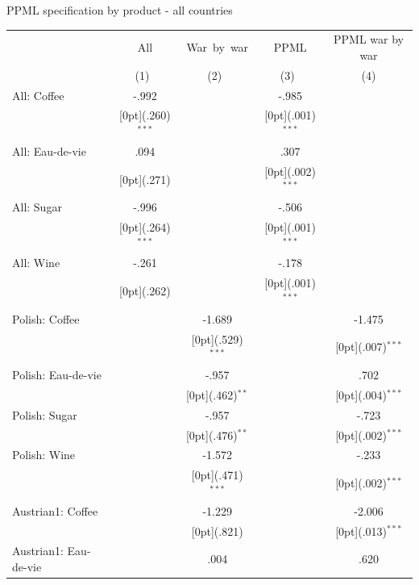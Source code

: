 \documentclass[12pt,a4paper,titlepage]{article}
\begin{document}
{\newpage
\caption{PPML specification by product - all countries}
\begin{tabular*}{\textwidth}{@{\extracolsep{\fill}}lcccc}				
	& \multicolumn{1}{c}{All} &	\multicolumn{1}{c}{War~by~war} &	\multicolumn{1}{c}{PPML} &	\multicolumn{1}{c}{PPML war by war} \\
\cline{2-5}				
	& \multicolumn{1}{c}{(1)\mbox{\ }} &	\multicolumn{1}{c}{(2)\mbox{\ }} &	\multicolumn{1}{c}{(3)\mbox{\ }} &	\multicolumn{1}{c}{(4)} \\
\hline				
All: Coffee &	-.992 &	&	-.985 &	\\
&	\raisebox{.7ex}[0pt]{\scriptsize (.260)$^{***}$} &	&	\raisebox{.7ex}[0pt]{\scriptsize (.001)$^{***}$} &	\\
All: Eau-de-vie &	.094 &	&	.307 &	\\
&	\raisebox{.7ex}[0pt]{\scriptsize (.271)} &	&	\raisebox{.7ex}[0pt]{\scriptsize (.002)$^{***}$} &	\\
All: Sugar &	-.996 &	&	-.506 &	\\
&	\raisebox{.7ex}[0pt]{\scriptsize (.264)$^{***}$} &	&	\raisebox{.7ex}[0pt]{\scriptsize (.001)$^{***}$} &	\\
All: Wine &	-.261 &	&	-.178 &	\\
&	\raisebox{.7ex}[0pt]{\scriptsize (.262)} &	&	\raisebox{.7ex}[0pt]{\scriptsize (.001)$^{***}$} &	\\
Polish: Coffee &	&	-1.689 &	&	-1.475 \\
&	&	\raisebox{.7ex}[0pt]{\scriptsize (.529)$^{***}$} &	&	\raisebox{.7ex}[0pt]{\scriptsize (.007)$^{***}$} \\
Polish: Eau-de-vie &	&	-.957 &	&	.702 \\
&	&	\raisebox{.7ex}[0pt]{\scriptsize (.462)$^{**}$} &	&	\raisebox{.7ex}[0pt]{\scriptsize (.004)$^{***}$} \\
Polish: Sugar &	&	-.957 &	&	-.723 \\
&	&	\raisebox{.7ex}[0pt]{\scriptsize (.476)$^{**}$} &	&	\raisebox{.7ex}[0pt]{\scriptsize (.002)$^{***}$} \\
Polish: Wine &	&	-1.572 &	&	-.233 \\
&	&	\raisebox{.7ex}[0pt]{\scriptsize (.471)$^{***}$} &	&	\raisebox{.7ex}[0pt]{\scriptsize (.002)$^{***}$} \\
Austrian1: Coffee &	&	-1.229 &	&	-2.006 \\
&	&	\raisebox{.7ex}[0pt]{\scriptsize (.821)} &	&	\raisebox{.7ex}[0pt]{\scriptsize (.013)$^{***}$} \\
Austrian1: Eau-de-vie &	&	.004 &	&	.620 \\

\end{tabular*}}
\end{document}
